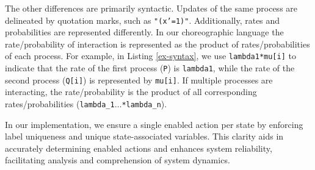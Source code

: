 The other differences are primarily syntactic. Updates of the same process are delineated by quotation marks, such as \texttt{"(x'=1)"}. Additionally, rates and probabilities are represented differently. In our choreographic language the rate/probability of interaction is represented as the product of rates/probabilities of each process. For example, in Listing \ref{ex-syntax}, we use \texttt{lambda1*mu[i]} to indicate that the rate of the first process (\texttt{P}) is \texttt{lambda1}, while the rate of the second process (\texttt{Q[i]}) is represented by \texttt{mu[i]}. If multiple processes are interacting, the rate/probability is the product of all corresponding rates/probabilities (\texttt{lambda\_1$\ldots$*lambda\_n}).

In our implementation, we ensure a single enabled action per state by enforcing label uniqueness and unique state-associated variables. This clarity aids in accurately determining enabled actions and enhances system reliability, facilitating analysis and comprehension of system dynamics.